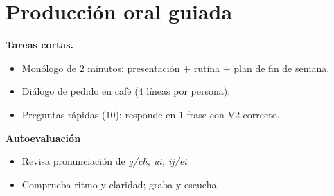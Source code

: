 \section{Producción oral guiada}
\textbf{Tareas cortas.}
\begin{itemize}[leftmargin=*]
  \item Monólogo de 2 minutos: presentación + rutina + plan de fin de semana.
  \item Diálogo de pedido en café (4 líneas por persona).
  \item Preguntas rápidas (10): responde en 1 frase con V2 correcto.
\end{itemize}

\textbf{Autoevaluación}
\begin{itemize}[leftmargin=*]
  \item Revisa pronunciación de \textit{g/ch, ui, ij/ei}.
  \item Comprueba ritmo y claridad; graba y escucha.
\end{itemize}
